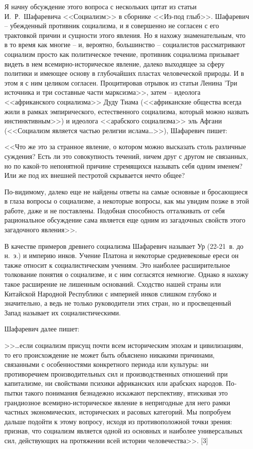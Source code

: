 \documentclass{book}
\begin{document}
Я начну обсуждение этого вопроса с нескольких цитат из статьи И.~Р.~Шафаревича <<Социализм>> в сборнике <<Из-под глыб>>. Шафаревич -- убежденный противник социализма, и я совершенно не согласен с его трактовкой причин и сущности этого явления. Но я нахожу знаменательным, что в то время как многие -- и, вероятно, большинство -- социалистов рассматривают социализм просто как политическое течение, противник социализма призывает видеть в нем всемирно-историческое явление, далеко выходящее за сферу политики и имеющее основу в глубочайших пластах человеческой природы. И в этом я с ним целиком согласен.
Процитировав отрывок из статьи Ленина 'Три источника и три составные части марксизма>>, затем -- идеолога <<африканского социализма>> Дуду Тиама (<<африканские общества всегда жили в рамках эмпирического, естественного социализма, который можно назвать инстинктивным>>) и идеолога <<арабского социализма>> эль Афгани (<<Социализм является частью религии ислама\ldots>>), Шафаревич пишет:

<<Что же это за странное явление, о котором можно высказать столь различные суждения? Есть ли это совокупность течений, ничем друг с другом не связанных, но по какой-то непо­нятной причине стремящихся называть себя одним именем? Или же под их внешней пестротой скрывается нечто общее?

По-видимому, далеко еще не найдены ответы на самые основные и бросающиеся в глаза вопросы о социализме, а некоторые вопросы, как мы увидим позже в этой работе, даже и не поставлены. Подобная способность отталкивать от себя рациональное обсуждение сама является еще одним из загадочных свойств этого загадочного явления>>.

В качестве примеров древнего социализма Шафаревич называет Ур (22-21~в. до н.~э.) и империю инков. Учение Платона и некоторые средневековые ереси он также относит к социалистическим учениям. Это наиболее расширительное толкование понятия о социализме, и с ним согласятся немногие. Однако я нахожу такое расширение не лишенным оснований. Сходст­во нашей страны или Китайской Народной Республики с импе­рией инков слишком глубоко и значительно, а ведь не только руководители этих стран, но и просвещенный Запад называет их социалистическими.

Шафаревич далее пишет:

>>\ldots если социализм присущ почти всем историческим эпохам и цивилизациям, то его происхождение не может быть объяс­нено никакими причинами, связанными с особенностями кон­кретного периода или культуры: ни противоречием производи­тельных сил и производственных отношений при капитализме, ни свойствами психики африканских или арабских народов. По­пытки такого понимания безнадежно искажают перспективу, втискивая это грандиозное всемирно-историческое явление в непригодные для него рамки частных экономических, истори­ческих и расовых категорий. Мы попробуем дальше подойти к этому вопросу, исходя из противоположной точки зрения: признав, что социализм является одной из основных и наибо­лее универсальных сил, действующих на протяжении всей исто­рии человечества>>. [3]
\end{document}
